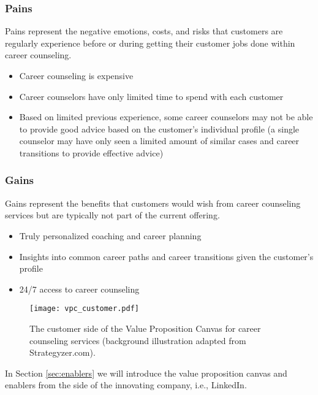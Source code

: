 \subsubsection{Pains}

Pains represent the negative emotions, costs, and risks that customers are regularly experience before
or during getting their customer jobs done within career counseling.

\begin{itemize}
    \item Career counseling is expensive
    \item Career counselors have only limited time to spend with each customer
    \item Based on limited previous experience, some career counselors may not be able to provide
        good advice based on the customer's individual profile (a single counselor may have only
        seen a limited amount of similar cases and career transitions to provide effective advice)
\end{itemize}

\subsubsection{Gains}

Gains represent the benefits that customers would wish from career counseling services but are 
typically not part of the current offering.

\begin{itemize}
    \item Truly personalized coaching and career planning
    \item Insights into common career paths and career transitions given the customer's profile
    \item 24/7 access to career counseling
\end{itemize}

\begin{figure}[h!]
    \centering
    \caption{The customer side of the Value Proposition Canvas for career counseling services (background illustration adapted from Strategyzer.com).}
    \label{fig:vpc_customer}
    \texttt{[image: vpc\_customer.pdf]}
\end{figure}

\noindent In Section \ref{sec:enablers} we will introduce the value proposition canvas and enablers from the
side of the innovating company, i.e., LinkedIn.